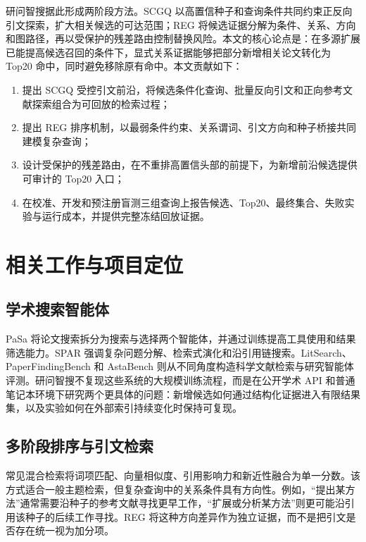 \documentclass[a4paper,11pt]{ctexart}
\begin{document}
研问智搜据此形成两阶段方法。SCGQ 以高置信种子和查询条件共同约束正反向引文探索，扩大相关候选的可达范围；REG 将候选证据分解为条件、关系、方向和图路径，再以受保护的残差路由控制替换风险。本文的核心论点是：在多源扩展已能提高候选召回的条件下，显式关系证据能够把部分新增相关论文转化为 Top20 命中，同时避免移除原有命中。本文贡献如下：
\begin{enumerate}[leftmargin=2em]
  \item 提出 SCGQ 受控引文前沿，将候选条件化查询、批量反向引文和正向参考文献探索组合为可回放的检索过程；
  \item 提出 REG 排序机制，以最弱条件约束、关系谓词、引文方向和种子桥接共同建模复杂查询；
  \item 设计受保护的残差路由，在不重排高置信头部的前提下，为新增前沿候选提供可审计的 Top20 入口；
  \item 在校准、开发和预注册盲测三组查询上报告候选、Top20、最终集合、失败实验与运行成本，并提供完整冻结回放证据。
\end{enumerate}

\section{相关工作与项目定位}
\subsection{学术搜索智能体}
PaSa 将论文搜索拆分为搜索与选择两个智能体，并通过训练提高工具使用和结果筛选能力。SPAR 强调复杂问题分解、检索式演化和沿引用链搜索。LitSearch、PaperFindingBench 和 AstaBench 则从不同角度构造科学文献检索与研究智能体评测。研问智搜不复现这些系统的大规模训练流程，而是在公开学术 API 和普通笔记本环境下研究两个更具体的问题：新增候选如何通过结构化证据进入有限结果集，以及实验如何在外部索引持续变化时保持可复现。

\subsection{多阶段排序与引文检索}
常见混合检索将词项匹配、向量相似度、引用影响力和新近性融合为单一分数。该方式适合一般主题检索，但复杂查询中的关系条件具有方向性。例如，``提出某方法''通常需要沿种子的参考文献寻找更早工作，``扩展或分析某方法''则更可能沿引用该种子的后续工作寻找。REG 将这种方向差异作为独立证据，而不是把引文是否存在统一视为加分项。
\end{document}
